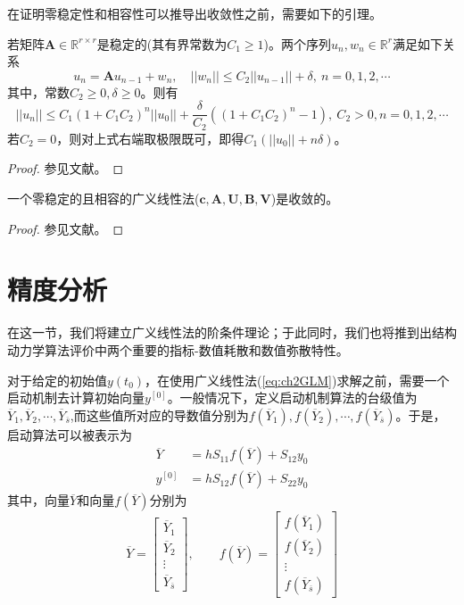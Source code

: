 在证明零稳定性和相容性可以推导出收敛性之前，需要如下的引理。
\begin{lemma}
若矩阵$\bm{A}\in\mathbb{R}^{r\times r}$是稳定的(其有界常数为$C_1\ge1$)。两个序列$u_n,w_n\in\mathbb{R}^r$满足如下关系
\begin{equation}
u_n=\bm{A}u_{n-1}+w_n,\quad ||w_n||\le C_2||u_{n-1}||+\delta,\ n=0,1,2,\cdots
\end{equation}
其中，常数$C_2\ge0,\delta\ge0$。则有
\begin{equation}
||u_n||\le C_1(1+C_1C_2)^n||u_0||+\frac{\delta}{C_2}\left((1+C_1C_2)^n-1\right),\ C_2>0,n=0,1,2,\cdots
\end{equation}
若$C_2=0$，则对上式右端取极限既可，即得$C_1(||u_0||+n\delta)$。
\end{lemma}
\begin{proof}
参见文献。
\end{proof}

\begin{theorem}
一个零稳定的且相容的广义线性法($\bm{c},\bm{A},\bm{U},\bm{B},\bm{V}$)是收敛的。
\end{theorem}
\begin{proof}
参见文献。
\end{proof}

\section{精度分析}
在这一节，我们将建立广义线性法的阶条件理论；于此同时，我们也将推到出结构动力学算法评价中两个重要的指标-数值耗散和数值弥散特性。

对于给定的初始值$y(t_0)$，在使用广义线性法(\ref{eq:ch2GLM})求解之前，需要一个启动机制去计算初始向量$y^{[0]}$。一般情况下，定义启动机制算法的台级值为$\overline{Y}_1,\overline{Y}_2,\cdots,\overline{Y}_{\overline{s}}$,而这些值所对应的导数值分别为$f(\overline{Y}_1),f(\overline{Y}_2),\cdots,f(\overline{Y}_{\overline{s}})$。于是，启动算法可以被表示为
\begin{equation}
\begin{aligned}
\overline{Y}&=hS_{11}f(\overline{Y})+S_{12}y_0\\
y^{[0]}&=hS_{12}f(\overline{Y})+S_{22}y_0
\end{aligned}
\end{equation}
其中，向量$\overline{Y}$和向量$f(\overline{Y})$分别为
\begin{equation}
\overline{Y}=\begin{bmatrix}
\overline{Y}_1\\
\overline{Y}_2\\
\vdots\\
\overline{Y}_{\overline{s}}
\end{bmatrix},\qquad f(\overline{Y})=\begin{bmatrix}
f(\overline{Y}_1)\\
f(\overline{Y}_2)\\
\vdots\\
f(\overline{Y}_{\overline{s}})
\end{bmatrix}
\end{equation}

